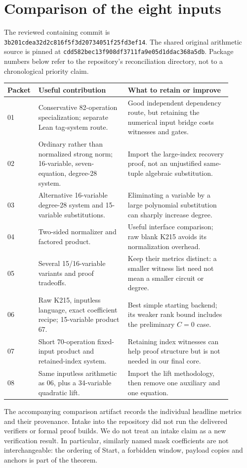 \documentclass[11pt]{article}
\begin{document}
\section{Comparison of the eight inputs}
The reviewed containing commit is
\texttt{3b201cdea32d2c816f5f3d20734051f25fd3ef14}.
The shared original arithmetic source is pinned at
\texttt{cdd582bec13f908df3711fa9e05d1ddac368a5db}.
Package numbers below refer to the repository's reconciliation directory, not to a chronological priority claim.
\begin{center}\small
\begin{tabular}{p{0.08\linewidth}>{\raggedright\arraybackslash}p{0.38\linewidth}>{\raggedright\arraybackslash}p{0.44\linewidth}}
\toprule
Packet&Useful contribution&What to retain or improve\\
\midrule
01&Conservative 82-operation specialization; separate Lean tag-system route.&Good independent dependency route, but retaining the numerical input bridge costs witnesses and gates.\\
02&Ordinary rather than normalized strong norm; 16-variable, seven-equation, degree-28 system.&Import the large-index recovery proof, not an unjustified same-tuple algebraic substitution.\\
03&Alternative 16-variable degree-28 system and 15-variable substitutions.&Eliminating a variable by a large polynomial substitution can sharply increase degree.\\
04&Two-sided normalizer and factored product.&Useful interface comparison; raw blank K215 avoids its normalization overhead.\\
05&Several 15/16-variable variants and proof tradeoffs.&Keep their metrics distinct: a smaller witness list need not mean a smaller circuit or degree.\\
06&Raw K215, inputless language, exact coefficient recipe; 15-variable product 67.&Best simple starting backend; its weaker rank bound includes the preliminary $C=0$ case.\\
07&Short 70-operation fixed-input product and retained-index system.&Retaining index witnesses can help proof structure but is not needed in our final core.\\
08&Same inputless arithmetic as 06, plus a 34-variable quadratic lift.&Import the lift methodology, then remove one auxiliary and one equation.\\
\bottomrule
\end{tabular}
\end{center}
The accompanying comparison artifact records the individual headline metrics and their provenance. Intake into the repository did not run the delivered verifiers or formal proof builds. We do not treat an intake claim as a new verification result. In particular, similarly named mask coefficients are not interchangeable: the ordering of Start, a forbidden window, payload copies and anchors is part of the theorem.
\end{document}
